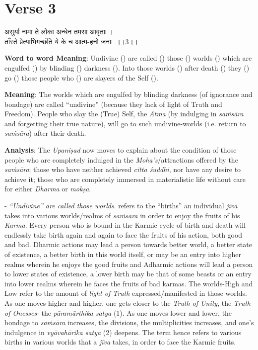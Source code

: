 \chapter{Verse 3}

\begin{moolashloka}
असुर्या नामा ते लोका अन्धेन तमसा आवृताः ।\\
ताँस्ते प्रेत्याभिगच्छंति ये के च आत्म-हनो जनाः~।।3।।
\end{moolashloka}

\textbf{Word to word Meaning}: Undivine () are called () those () worlds () which are engulfed () by blinding () darkness (). Into those worlds () after death () they () go () those people who () are slayers of the Self ().

\textbf{Meaning}: The worlds which are engulfed by blinding darkness (of ignorance and bondage) are called ``undivine'' (because they lack of light of Truth and Freedom). People who slay the (True) Self, the \emph{Ātma} (by indulging in \emph{saṁsāra} and forgetting their true nature), will go to such undivine-worlds (i.e. return to \emph{saṁsāra}) after their death.

\textbf{Analysis}: The \emph{Upaniṣad} now moves to explain about the condition of those people who are completely indulged in the \emph{Moha's}/attractions offered by the \emph{saṁsāra}; those who have neither achieved \emph{citta śuddhi}, nor have any desire to achieve it; those who are completely immersed in materialistic life without care for either \emph{Dharma} or \emph{mokṣa}.

- \emph{``Undivine'' are called those worlds}.  refers to the ``births'' an individual \emph{jīva} takes into various worlds/realms of \emph{saṁsāra} in order to enjoy the fruits of his \emph{Karma}. Every person who is bound in the Karmic cycle of birth and death will endlessly take birth again and again to face the fruits of his action, both good and bad. Dharmic actions may lead a person towards better world, a better state of existence, a better birth in this world itself, or may be an entry into higher realms wherein he enjoys the good fruits and Adharmic actions will lead a person to lower states of existence, a lower birth may be that of some beasts or an entry into lower realms wherein he faces the fruits of bad karmas. The worlds-High and Low refer to the amount of \emph{light of Truth} expressed/manifested in those worlds. As one moves higher and higher, one gets closer to the \emph{Truth of Unity}, the \emph{Truth of Onesses}- the \emph{pāramārthika satya} (1). As one moves lower and lower, the bondage to \emph{saṁsāra} increases, the divisions, the multiplicities increases, and one's indulgence in \emph{vyāvahārika satya} (2) deepens. The term  hence refers to various births in various worlds that a \emph{jīva} takes, in order to face the Karmic fruits.

